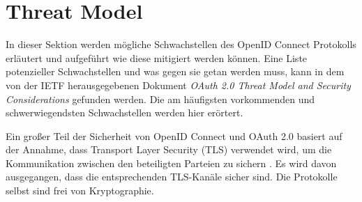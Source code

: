 


\section{Threat Model}

In dieser Sektion werden mögliche Schwachstellen des OpenID Connect Protokolls erläutert und aufgeführt wie diese mitigiert werden können. Eine Liste potenzieller Schwachstellen und was gegen sie getan werden muss, kann in dem von der IETF herausgegebenen Dokument \textit{OAuth 2.0 Threat Model and Security Considerations} \cite{RFC6819} gefunden werden. Die am häufigsten vorkommenden und schwerwiegendsten Schwachstellen werden hier erörtert. \cite{ssoProtocols}

Ein großer Teil der Sicherheit von OpenID Connect und OAuth 2.0 basiert auf der Annahme, dass Transport Layer Security (TLS) verwendet wird, um die Kommunikation zwischen den beteiligten Parteien zu sichern \cite{mladenov2016security}. Es wird davon ausgegangen, dass die entsprechenden TLS-Kanäle sicher sind. Die Protokolle selbst sind frei von Kryptographie.

